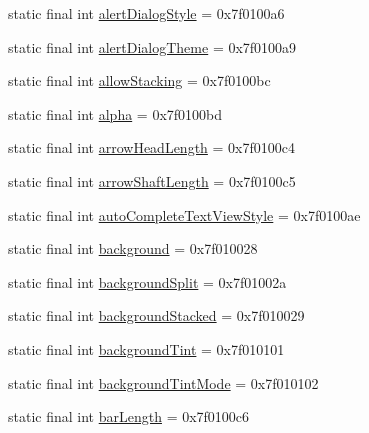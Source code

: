 \begin{CompactItemize}
\item 
static final int \hyperlink{classandroid_1_1support_1_1v7_1_1mediarouter_1_1_r_1_1attr_ce557ee59064a5406fe2c6b2d2b22061}{alertDialogStyle} = 0x7f0100a6
\item 
static final int \hyperlink{classandroid_1_1support_1_1v7_1_1mediarouter_1_1_r_1_1attr_ea2e2fbfac9272b0cff7dcd563179457}{alertDialogTheme} = 0x7f0100a9
\item 
static final int \hyperlink{classandroid_1_1support_1_1v7_1_1mediarouter_1_1_r_1_1attr_3a8c418a8307a820d873bf93e2bfe067}{allowStacking} = 0x7f0100bc
\item 
static final int \hyperlink{classandroid_1_1support_1_1v7_1_1mediarouter_1_1_r_1_1attr_29f1809de755ef7293481f09d1f24296}{alpha} = 0x7f0100bd
\item 
static final int \hyperlink{classandroid_1_1support_1_1v7_1_1mediarouter_1_1_r_1_1attr_3d25f31e64f13e63efc9621415977e50}{arrowHeadLength} = 0x7f0100c4
\item 
static final int \hyperlink{classandroid_1_1support_1_1v7_1_1mediarouter_1_1_r_1_1attr_be432544080cb2d6dfb9999cf27fe85a}{arrowShaftLength} = 0x7f0100c5
\item 
static final int \hyperlink{classandroid_1_1support_1_1v7_1_1mediarouter_1_1_r_1_1attr_0a1364db52561af1198856c974a384d0}{autoCompleteTextViewStyle} = 0x7f0100ae
\item 
static final int \hyperlink{classandroid_1_1support_1_1v7_1_1mediarouter_1_1_r_1_1attr_c671a1eddbc8f9c1e177a19873f717e5}{background} = 0x7f010028
\item 
static final int \hyperlink{classandroid_1_1support_1_1v7_1_1mediarouter_1_1_r_1_1attr_5d475492ada8d62600ca4ae68baccf12}{backgroundSplit} = 0x7f01002a
\item 
static final int \hyperlink{classandroid_1_1support_1_1v7_1_1mediarouter_1_1_r_1_1attr_34bbc10d4d0258fb299005b41d3decd3}{backgroundStacked} = 0x7f010029
\item 
static final int \hyperlink{classandroid_1_1support_1_1v7_1_1mediarouter_1_1_r_1_1attr_e473f4ff3d4d07b9c6dd90c6ba3be78e}{backgroundTint} = 0x7f010101
\item 
static final int \hyperlink{classandroid_1_1support_1_1v7_1_1mediarouter_1_1_r_1_1attr_849cdc5f356a27c4255b452f0f20dd9c}{backgroundTintMode} = 0x7f010102
\item 
static final int \hyperlink{classandroid_1_1support_1_1v7_1_1mediarouter_1_1_r_1_1attr_45e5cce3e0fdce7f2c53217fc654a608}{barLength} = 0x7f0100c6
\item 

\end{CompactItemize}
